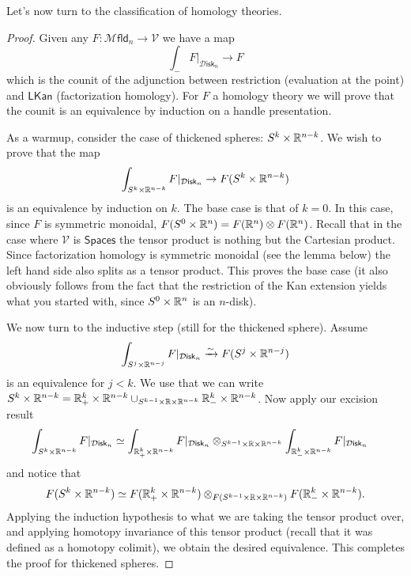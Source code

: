 \documentclass{amsart}
\begin{document}
Let's now turn to the classification of homology theories.
\begin{proof}
    Given any $F:\mathcal{M}\mathsf{fld}_n\to \mathcal{V}$ we have a map
    \begin{equation*}
        \int_- F|_{\mathcal{D}\mathsf{isk}_n} \to F
    \end{equation*}
    which is the counit of the adjunction between restriction (evaluation at the point) and $\mathsf{LKan}$
    (factorization homology). For $F$ a homology theory we will prove that the counit is
    an equivalence by induction on a handle presentation.

    As a warmup, consider the case of thickened spheres: $S^k\times\mathbb{R}^{n-k}$. We wish to prove
    that the map
    \begin{equation*}
        \int_{S^k\times\mathbb{R}^{n-k}} F|_{\mathcal{D}\mathsf{isk}_n}\to F(S^k\times\mathbb{R}^{n-k})
    \end{equation*}
    is an equivalence by induction on $k$. The base case is that of $k=0$. In this case,
    since $F$ is symmetric monoidal, $F(S^0\times\mathbb{R}^n)=F(\mathbb{R}^n)\otimes F(\mathbb{R}^n)$. Recall
    that in the case where $\mathcal{V}$ is $\mathsf{Spaces}$ the tensor product is nothing
    but the Cartesian product. Since factorization homology is symmetric monoidal (see
    the lemma below) the left hand side also splits as a tensor product. This proves the base
    case (it also obviously follows from the fact that the restriction of the Kan extension
    yields what you started with, since $S^0\times\mathbb{R}^n$ is an $n$-disk).

    We now turn to the inductive step (still for the thickened sphere). Assume
    \begin{equation*}
        \int_{S^j\times\mathbb{R}^{n-j}} F|_{\mathcal{D}\mathsf{isk}_n}\xrightarrow{\sim} F(S^j\times\mathbb{R}^{n-j})
    \end{equation*}
    is an equivalence for $j<k$.
    We use that we can write $S^k\times \mathbb{R}^{n-k} = \mathbb{R}^{k}_+\times\mathbb{R}^{n-k}\cup_{S^{k-1}\times\mathbb{R}\times\mathbb{R}^{n-k}}\mathbb{R}^k_-\times\mathbb{R}^{n-k}$.
    Now apply our excision result
    \begin{align*}
        \int_{S^k\times\mathbb{R}^{n-k}}F|_{\mathcal{D}\mathsf{isk}_n} &\simeq \int_{\mathbb{R}^k_+\times\mathbb{R}^{n-k}}F|_{\mathcal{D}\mathsf{isk}_n}\otimes_{S^{k-1}\times\mathbb{R}\times\mathbb{R}^{n-k}} \int_{\mathbb{R}^k_-\times\mathbb{R}^{n-k}} F|_{\mathcal{D}\mathsf{isk}_n}
    \end{align*}
    and notice that
    \begin{equation*}
        F(S^k\times\mathbb{R}^{n-k}) \simeq F(\mathbb{R}^k_+\times\mathbb{R}^{n-k})\otimes_{F(S^{k-1}\times\mathbb{R}\times\mathbb{R}^{n-k})} F(\mathbb{R}^k_-\times \mathbb{R}^{n-k}).
    \end{equation*}
    Applying the induction hypothesis to what we are taking the tensor product over, and applying
    homotopy invariance of this tensor product (recall that it was defined as a homotopy colimit),
    we obtain the desired equivalence. This completes the proof for thickened spheres.


\end{proof}
\end{document}
